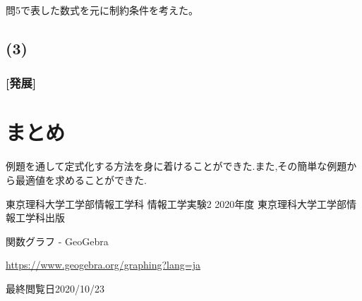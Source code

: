 \documentclass[12pt]{jarticle}
\begin{document}


問5で表した数式を元に制約条件を考えた。


\subsection*{(3)}
\subsubsection*{[発展]}

\section{まとめ}
例題を通して定式化する方法を身に着けることができた.また,その簡単な例題から最適値を求めることができた.


\clearpage

\begin{thebibliography}{99}
    \label{sannkoubunnkenn_chapter}
    東京理科大学工学部情報工学科 情報工学実験2 2020年度
    東京理科大学工学部情報工学科出版

    関数グラフ - GeoGebra

    \url{https://www.geogebra.org/graphing?lang=ja}

    最終閲覧日2020/10/23

\end{thebibliography}


\clearpage

\appendix
\end{document}
